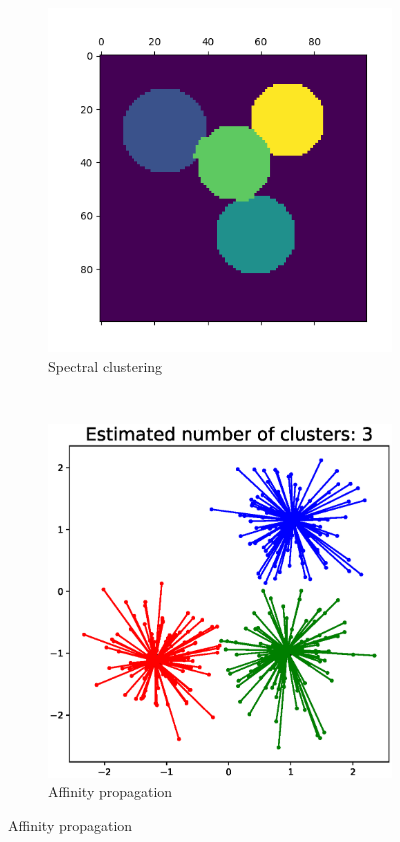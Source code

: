 \documentclass{beamer}
\begin{document}
\begin{frame}
\begin{figure}
\begin{subfigure}[b]{0.3\textwidth}
        \includegraphics[width=\textwidth]{pic/spectral_clustering.png}
        \caption{Spectral clustering}
    \end{subfigure}
    ~ %
    \begin{subfigure}[b]{0.3\textwidth}
        \includegraphics[width=\textwidth]{pic/affinity_propagation.eps}
        \caption{Affinity propagation}
    \end{subfigure}
\end{figure}
\end{frame}
\end{document}
